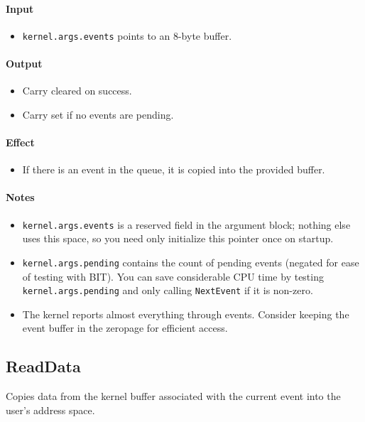 \paragraph{Input}
\begin{itemize}
\item \verb+kernel.args.events+ points to an 8-byte buffer.  
\end{itemize}

\paragraph{Output}
\begin{itemize}
\item Carry cleared on success.
\item Carry set if no events are pending.
\end{itemize}

\paragraph{Effect}
\begin{itemize}
\item If there is an event in the queue, it is copied into the provided buffer.
\end{itemize}

\paragraph{Notes}
\begin{itemize}
\item \verb+kernel.args.events+ is a reserved field in the argument block; nothing else uses this space, so you need only initialize this pointer once on startup.
\item \verb+kernel.args.pending+ contains the count of pending events (negated for ease of testing with BIT).  You can save considerable CPU time by testing \verb+kernel.args.pending+ and only calling \verb+NextEvent+ if it is non-zero.
\item The kernel reports almost everything through events.  Consider keeping the event buffer in the zeropage for efficient access.
\end{itemize}


\subsection*{ReadData}
Copies data from the kernel buffer associated with the current event into the user's address space.

